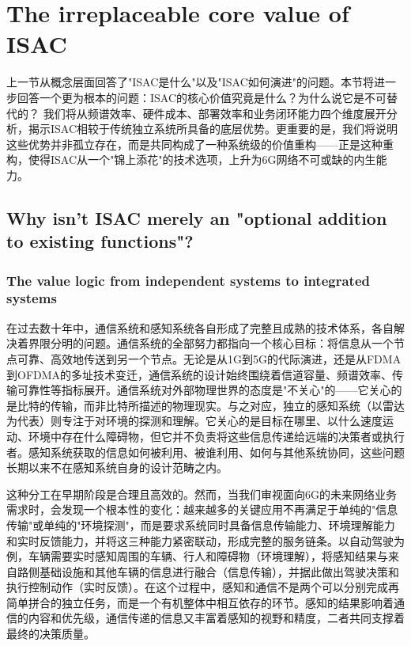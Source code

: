 
\section{The irreplaceable core value of ISAC}
\label{sec:ch1-isac-core value}


上一节从概念层面回答了"ISAC是什么"以及"ISAC如何演进"的问题。本节将进一步回答一个更为根本的问题：ISAC的核心价值究竟是什么？为什么说它是不可替代的？
我们将从频谱效率、硬件成本、部署效率和业务闭环能力四个维度展开分析，揭示ISAC相较于传统独立系统所具备的底层优势。更重要的是，我们将说明这些优势并非孤立存在，而是共同构成了一种系统级的价值重构——正是这种重构，使得ISAC从一个"锦上添花"的技术选项，上升为6G网络不可或缺的内生能力。

\subsection{Why isn't ISAC merely an "optional addition to existing functions"?}
\label{subsec:ch1-isac-core value-why}
\subsubsection{The value logic from independent systems to integrated systems}
\label{subsubsec:ch1-isac-core value-logic}

在过去数十年中，通信系统和感知系统各自形成了完整且成熟的技术体系，各自解决着界限分明的问题。通信系统的全部努力都指向一个核心目标：将信息从一个节点可靠、高效地传送到另一个节点。无论是从1G到5G的代际演进，还是从FDMA到OFDMA的多址技术变迁，通信系统的设计始终围绕着信道容量、频谱效率、传输可靠性等指标展开。通信系统对外部物理世界的态度是"不关心"的——它关心的是比特的传输，而非比特所描述的物理现实。与之对应，独立的感知系统（以雷达为代表）则专注于对环境的探测和理解。它关心的是目标在哪里、以什么速度运动、环境中存在什么障碍物，但它并不负责将这些信息传递给远端的决策者或执行者。感知系统获取的信息如何被利用、被谁利用、如何与其他系统协同，这些问题长期以来不在感知系统自身的设计范畴之内。

这种分工在早期阶段是合理且高效的。然而，当我们审视面向6G的未来网络业务需求时，会发现一个根本性的变化：越来越多的关键应用不再满足于单纯的"信息传输"或单纯的"环境探测"，而是要求系统同时具备信息传输能力、环境理解能力和实时反馈能力，并将这三种能力紧密联动，形成完整的服务链条。以自动驾驶为例，车辆需要实时感知周围的车辆、行人和障碍物（环境理解），将感知结果与来自路侧基础设施和其他车辆的信息进行融合（信息传输），并据此做出驾驶决策和执行控制动作（实时反馈）。在这个过程中，感知和通信不是两个可以分别完成再简单拼合的独立任务，而是一个有机整体中相互依存的环节。感知的结果影响着通信的内容和优先级，通信传递的信息又丰富着感知的视野和精度，二者共同支撑着最终的决策质量。

